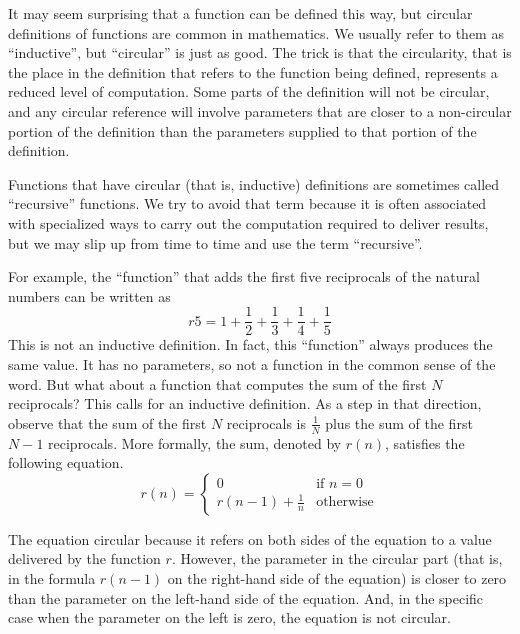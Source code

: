 It may seem surprising that a function can be defined this
way, but circular definitions of functions are common in mathematics.
We usually refer to them as ``inductive'', but ``circular'' is just as good.
The trick is that the circularity, that is the place in the definition that
refers to the function being defined, represents a reduced level of computation.
Some parts of the definition will not be circular, and any circular reference
will involve parameters that are closer to a non-circular portion of the
definition than the parameters supplied to that portion of the definition.

Functions that have circular (that is, inductive) definitions are sometimes
called ``recursive'' functions. We try to avoid that term because it is
often associated with specialized ways to carry out the computation
required to deliver results,
but we may slip up from time to time and use the term ``recursive''.

For example, the ``function'' that adds the first five reciprocals of the
natural numbers can be written as
\begin{displaymath}
r5 = 1 + \frac{1}{2} + \frac{1}{3} + \frac{1}{4} + \frac{1}{5}
\end{displaymath}
This is not an inductive definition.
In fact, this
``function'' always produces the same value.
It has no parameters, so
not a function in the common sense
of the word.  But what about a function that computes the sum of the
first $N$ reciprocals?
This calls for an inductive definition.
As a step in that direction, observe that
the sum of the first $N$ reciprocals is $\frac{1}{N}$
plus the sum of the first $N-1$ reciprocals.
More formally, the sum, denoted by $r(n)$, satisfies the following equation.
\label{reciprocalsdef}
\begin{displaymath}
r(n) =
\left\{
        \begin{array}{ll}
                0                    & \mbox{if } n = 0 \\
                r(n-1) + \frac{1}{n} & \mbox{otherwise}
        \end{array}
\right.
\end{displaymath}

The equation circular because it refers on both sides of the equation
to a value delivered by the function $r$.
However, the parameter in the circular part
(that is, in the formula $r(n-1)$ on the right-hand side of the equation)
is closer to zero than the parameter on the left-hand side of the equation.
And, in the specific case when the parameter on the left is zero,
the equation is not circular.

